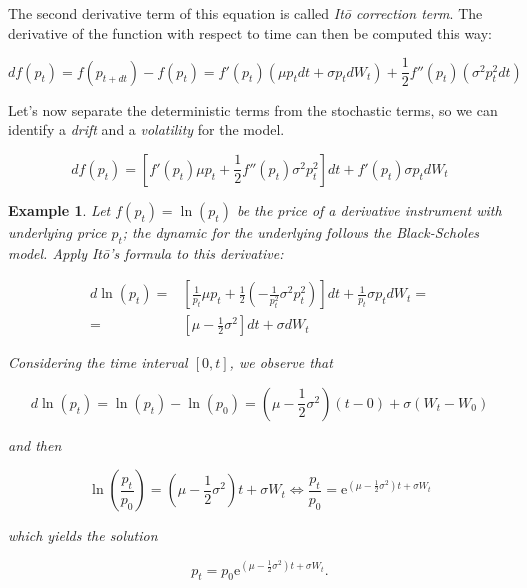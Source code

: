\documentclass[oneside,titlepage,headinclude,12pt,a4paper,BCOR5mm,footinclude]{book}
\theoremstyle{defn}
\newtheorem{example}{Example}
\begin{document}
The second derivative term of this equation is called \textit{It\=o correction
term}.  The derivative  of  the function  with  respect to  time  can then  be
computed this way:

\[
  df(p_t) = f(p_{t+dt}) - f(p_t) = f'(p_t)(\mu p_t dt + \sigma p_t dW_t) + 
  \frac{1}{2} f''(p_t)(\sigma^2 p_t^2 dt)
\]

Let's now  separate the deterministic terms  from the stochastic terms,  so we
can identify a \textit{drift} and a \textit{volatility} for the model.

\[
  df(p_t) = \left[ f'(p_t)\mu p_t + \frac{1}{2}f''(p_t)\sigma^2 p_t^2\right]dt
    + f'(p_t)\sigma p_t dW_t
\]

\begin{example}
  Let  $f(p_t) =  \ln(p_t)$  be  the price  of  a  derivative instrument  with
  underlying  price  $p_t$;  the  dynamic   for  the  underlying  follows  the
  Black-Scholes model. Apply It\=o's formula to this derivative:

  \begin{align*}
    d\ln(p_t) = & \left[ \frac{1}{p_t} \mu p_t + \frac{1}{2}\left( 
      -\frac{1}{p_t^2}\sigma^2 p_t^2\right)\right]dt +
      \frac{1}{p_t}\sigma p_t dW_t = \\
      = & \left[\mu - \frac{1}{2} \sigma^2 \right]dt + \sigma dW_t
  \end{align*}

  Considering the time interval $[0,t]$, we observe that
  
  \[
    d\ln(p_t) = \ln(p_t) - \ln(p_0) = \left( \mu - \frac{1}{2}\sigma^2 \right)
      (t-0) + \sigma (W_t - W_0)
  \]
  
  and then
  
  \[
    \ln\left(\frac{p_t}{p_0}\right) = \left(\mu -\frac{1}{2}\sigma^2\right)t + \sigma W_t
    \iff
    \frac{p_t}{p_0} = \mathrm{e}^{\left(\mu - \frac{1}{2}\sigma^2\right)t + \sigma W_t}
  \]
  
  which yields the solution
  
  \[
    p_t = p_0 \mathrm{e}^{\left(\mu - \frac{1}{2}\sigma^2\right)t + \sigma W_t}.
  \]
\end{example}
\end{document}
